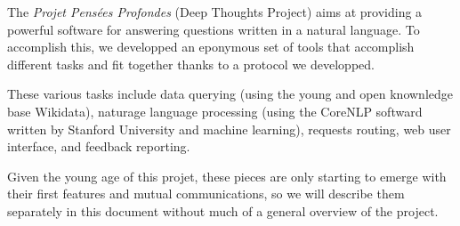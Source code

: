 The {\em Projet Pensées Profondes} (Deep Thoughts Project) aims at
providing a powerful software for answering questions written in a
natural language.
To accomplish this, we developped an eponymous set of tools that
accomplish different tasks and fit together thanks to a protocol
we developped.

These various tasks include data querying (using the young and open
knownledge base Wikidata), naturage language processing (using the
CoreNLP softward written by Stanford University and machine learning),
requests routing, web user interface, and feedback reporting.

Given the young age of this projet, these pieces are only starting
to emerge with their first features and mutual communications,
so we will describe them separately in this document without
much of a general overview of the project.
